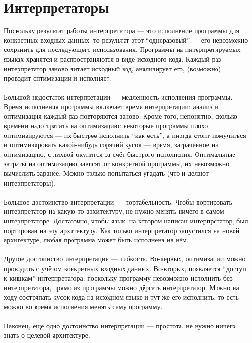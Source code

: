 \documentclass[11pt]{book}
\begin{document}
\section{Интерпретаторы}
Поскольку результат работы интерпретатора --- это исполнение программы для конкретных входных данных,
то результат этот ``одноразовый'' --- его невозможно сохранить для последующего использования.
Программы на интерпретируемых языках хранятся и распространяются в виде исходного кода.
Каждый раз интерпретатор заново читает исходный код, анализирует его, (возможно) проводит оптимизации
и исполняет.
\\ \\
Большой недостаток интерпретации --- медленность исполнения программы.
Время исполнения программы включает время интерпретации: анализ и оптимизация каждый раз повторяются заново.
Кроме того, непонятно, сколько времени надо тратить на оптимизацию:
некоторые программы плохо оптимизируются --- их быстрее исполнить ``как есть'',
а иногда стоит помучиться и оптимизировать какой-нибудь горячий кусок ---
время, затраченное на оптимизацию, с лихвой окупится за счёт быстрого исполнения.
Оптимальные затраты на оптимизацию зависят от конкретной программы, их невозможно вычислить заранее.
Можно только попытаться угадать (что и делают интерпретаторы).
\\ \\
Большое достоинство интерпретации --- портабельность.
Чтобы портировать интерпретатор на какую-то архитектуру, не нужно менять ничего в самом интерпретаторе.
Достаточно, чтобы язык, на котором написан интерпретатор, был портирован на эту архитектуру.
Как только интерпретатор запустился на новой архитектуре, любая программа может быть исполнена на нём.
\\ \\
Другое достоинство интерпретации --- гибкость.
Во-первых, оптимизации можно проводить с учётом конкретных входных данных.
Во-вторых, появляется ``доступ к кишкам'' интерпретатора:
поскольку программу невозможно исполнить без интерпретатора, прямо из программы можно дёргать интерпретатор.
Можно на ходу состряпать кусок кода на исходном языке и тут же его исполнить,
то есть можно во время исполнения менять саму программу.
\\ \\
Наконец, ещё одно достоинство интерпретации --- простота: не нужно ничего знать о целевой архитектуре.
\end{document}
